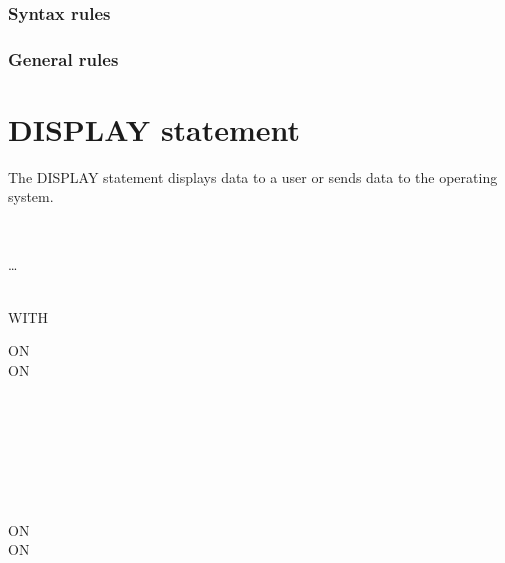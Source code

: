 \subsubsection{Syntax rules}

\subsubsection{General rules}

\section{DISPLAY statement}

The DISPLAY statement displays data to a user or sends data to the operating system.

\begin{syntax}
  \begin{1=}
    \identifier \\
    \literal
  \end{1=} \ldots
  \begin{0+}
     \mnemonicname \\
    WITH  
  \end{0+}

  \begin{0+}
    ON  \imperativestatement \\
     ON  \imperativestatement \\
  \end{0+}

  \begin{0-1}
  \end{0-1}
\end{syntax}

\begin{syntax}[\miscextcolour]
  \begin{1=}
    \identifier \\
    \literal
  \end{1=}
  \begin{1=}
     \\
     \\
     \\
     \\
  \end{1=}

  \begin{0+}
    ON  \imperativestatement \\
     ON  \imperativestatement \\
  \end{0+}

  \begin{0-1}
  \end{0-1}
\end{syntax}

